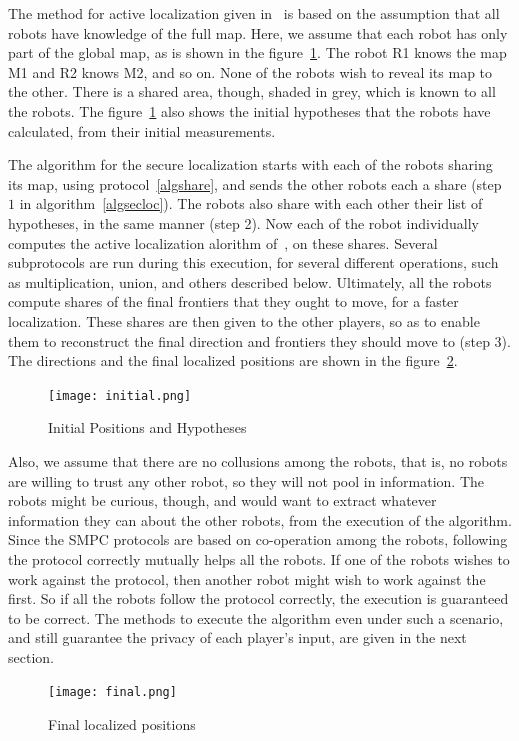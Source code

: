 The method for active localization given in~\cite{BK08} is based on the assumption that all robots 
have knowledge of the full map. Here, we assume that each robot has only part of the global map, as
is shown in the figure~\ref{fig2a}. The robot R1 knows the map M1 and R2 knows M2, and so on. None of the robots 
wish to reveal its map to the other. There is a shared area, though, shaded in grey, which is known to all the robots.
The figure~\ref{fig2a} also shows the initial hypotheses that the robots have calculated, from their initial measurements.


The algorithm for the secure localization starts with each of the robots sharing its map, using 
protocol~\ref{algshare}, and sends the other robots each a share (step $1$ in algorithm~\ref{algsecloc}). 
The robots also share with each other
their list of hypotheses, in the same manner (step 2). Now each of the robot individually computes the active
localization alorithm of~\cite{BK08}, on these shares. Several subprotocols are run during this execution,
for several different operations, such as multiplication, union, and others described below. 
Ultimately, all the robots compute shares of the final frontiers that they ought to move, for a faster
localization. These shares are then given to the other players, so as to enable them to reconstruct
the final direction and frontiers they should move to (step 3). The directions and the final localized positions 
are shown in the figure~\ref{fig2b}. 

\begin{figure}
\texttt{[image: initial.png]}
\caption{Initial Positions and Hypotheses}
\label{fig2a}
\end{figure}


Also, we assume that there are no collusions among the robots, that is, no robots are willing to trust 
any other robot, so they will not pool in information. The robots might be curious, though, and would want 
to extract whatever information they can about the other robots, from the execution of the algorithm. Since 
the SMPC protocols are based on co-operation among the robots, following the protocol correctly mutually 
helps all the robots. If one of the robots wishes to work against the protocol, then another robot might wish 
to work against the first. So if all the robots follow the protocol correctly, the execution is guaranteed to 
be correct. The methods to execute the algorithm even under such a scenario, and still guarantee 
the privacy of each player's input, are given in the next section.

\begin{figure}
\texttt{[image: final.png]}
\caption{Final localized positions}
\label{fig2b}
\end{figure}


